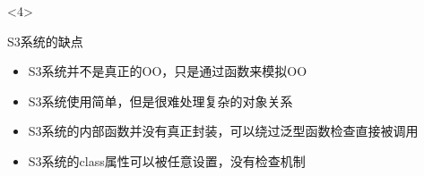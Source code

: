 \begin{frame}[t,fragile]{\subsecname}{\subsubsecname}
\begin{overlayarea}{\textwidth}{0.5\textheight}
\begin{onlyenv}<4>
\begin{badbox}{S3系统的缺点}
\begin{itemize}
\item[\PencilLeftDown] S3系统并不是真正的OO，只是通过函数来模拟OO
\item[\PencilLeftDown] S3系统使用简单，但是很难处理复杂的对象关系
\item[\PencilLeftDown] S3系统的内部函数并没有真正封装，可以绕过泛型函数检查直接被调用
\item[\PencilLeftDown] S3系统的class属性可以被任意设置，没有检查机制
\end{itemize}
\end{badbox}
\end{onlyenv}
\end{overlayarea}
\end{frame}

